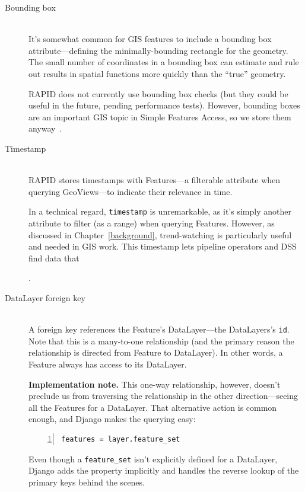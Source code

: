 \begin{description}
\item[Bounding box] \hfill \\
  It's somewhat common for GIS features to include a bounding box attribute---defining the minimally-bounding rectangle for the geometry. The small number of coordinates in a bounding box can estimate and rule out results in spatial functions more quickly than the ``true'' geometry.

  RAPID does not currently use bounding box checks (but they could be useful in the future, pending performance tests). However, bounding boxes are an important GIS topic in Simple Features Access, so we store them anyway~\cite{SFA}.
  
\item[Timestamp] \hfill \\
RAPID stores timestamps with Features---a filterable attribute when querying GeoViews---to indicate their relevance in time.

In a technical regard, \texttt{timestamp} is unremarkable, as it's simply another attribute to filter (as a range) when querying Features. However, as discussed in Chapter~\ref{background}, trend-watching is particularly useful and needed in GIS work. This timestamp lets pipeline operators and DSS find data that .
  
\item[DataLayer foreign key] \hfill \\
A foreign key references the Feature's DataLayer---the DataLayers's \texttt{id}. Note that this is a many-to-one relationship (and the primary reason the relationship is directed from Feature to DataLayer). In other words, a Feature always has access to its DataLayer.

\textbf{Implementation note.} This one-way relationship, however, doesn't preclude us from traversing the relationship in the other direction---seeing all the Features for a DataLayer. That alternative action is common enough, and Django makes the querying easy: 

\begin{Verbatim}[samepage=true,baselinestretch=1,numbers=left,xleftmargin=12mm]
features = layer.feature_set
\end{Verbatim}

Even though a \texttt{feature\_set} isn't explicitly defined for a DataLayer, Django adds the property implicitly and handles the reverse lookup of the primary keys behind the scenes.

\end{description}

